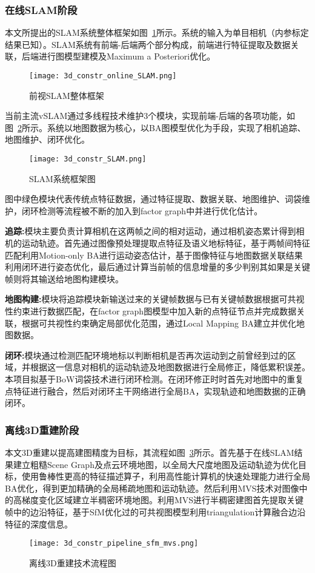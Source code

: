 \subsubsection{在线SLAM阶段}
\label{sec:3.3.3.1}
本文所提出的SLAM系统整体框架如图~\ref{fig:3d_constr_online_SLAM.png}所示。系统的输入为单目相机（内参标定结果已知）。SLAM系统有前端-后端两个部分构成，前端进行特征提取及数据关联，后端进行图模型建模及Maximum a Posteriori优化。
\begin{figure}[h] %
  \centering
  \texttt{[image: 3d\_constr\_online\_SLAM.png]}
  \caption{前视SLAM整体框架}
  \label{fig:3d_constr_online_SLAM.png}
\end{figure}
当前主流vSLAM通过多线程技术维护3个模块，实现前端-后端的各项功能，如图~\ref{fig:3d_constr_SLAM}所示。系统以地图数据为核心，以BA图模型优化为手段，实现了相机追踪、地图维护、闭环优化。
\begin{figure}[t] %
  \centering
  \texttt{[image: 3d\_constr\_SLAM.png]}
  \caption{SLAM系统框架图}
  \label{fig:3d_constr_SLAM}
\end{figure}
图中绿色模块代表传统点特征数据，通过特征提取、数据关联、地图维护、词袋维护，闭环检测等流程被不断的加入到factor graph中并进行优化估计。

\textbf{追踪:}模块主要负责计算相机在这两帧之间的相对运动，通过相机姿态累计得到相机的运动轨迹。首先通过图像预处理提取点特征及语义地标特征，基于两帧间特征匹配利用Motion-only BA进行运动姿态估计，基于图像特征与地图数据关联结果利用闭环进行姿态优化，最后通过计算当前帧的信息增量的多少判别其如果是关键帧则将其输送给地图构建模块。

\textbf{地图构建:}模块将追踪模块新输送过来的关键帧数据与已有关键帧数据根据可共视性约束进行数据匹配，在factor graph图模型中加入新的点特征节点并完成数据关联，根据可共视性约束确定局部优化范围，通过Local Mapping BA建立并优化地图数据。

\textbf{闭环:}模块通过检测匹配环境地标以判断相机是否再次运动到之前曾经到过的区域，并根据这一信息对相机的运动轨迹及地图数据进行全局修正，降低累积误差。本项目拟基于BoW词袋技术进行闭环检测。在闭环修正时时首先对地图中的重复点特征进行融合，然后对闭环主干网络进行全局BA，实现轨迹和地图数据的正确闭环。
\subsubsection{离线3D重建阶段}
\label{sec:3.3.3.2}
本文3D重建以提高建图精度为目标，其流程如图~\ref{fig:3d_constr_pipeline_sfm_mvs}所示。首先基于在线SLAM结果建立粗糙Scene Graph及点云环境地图，以全局大尺度地图及运动轨迹为优化目标，使用鲁棒性更高的特征描述算子，利用高性能计算机的快速处理能力进行全局BA优化，得到更加精确的全局稀疏地图和运动轨迹。然后利用MVS技术对图像中的高梯度变化区域建立半稠密环境地图。利用MVS进行半稠密建图首先提取关键帧中的边沿特征，基于SfM优化过的可共视图模型利用triangulation计算融合边沿特征的深度信息。 
\begin{figure}[t] %
  \centering
  \texttt{[image: 3d\_constr\_pipeline\_sfm\_mvs.png]}
  \caption{离线3D重建技术流程图}
  \label{fig:3d_constr_pipeline_sfm_mvs}
\end{figure}
